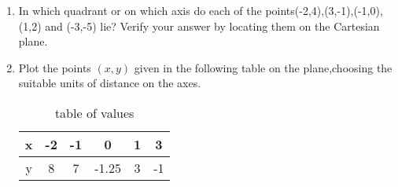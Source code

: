 \begin{enumerate}
\item In which quadrant or on which axis do each of the points(-2,4),(3,-1),(-1,0),(1,2) and (-3,-5) lie? Verify your answer by locating them on the Cartesian plane.
\item Plot the points $(x,y)$ given in the following table on the plane,choosing the suitable units of distance on the axes.
\begin{table}[h]
\begin{center}
\begin{tabular}{|c|c|c|c|c|c|}
\hline	
x & -2 & -1 & 0 & 1 & 3\\
\hline
y & 8 & 7 & -1.25 & 3 & -1\\
\hline
\end{tabular}
\caption{table of values}
\label{table:Table of values}
\end{center}
\end{table}
\end{enumerate}

